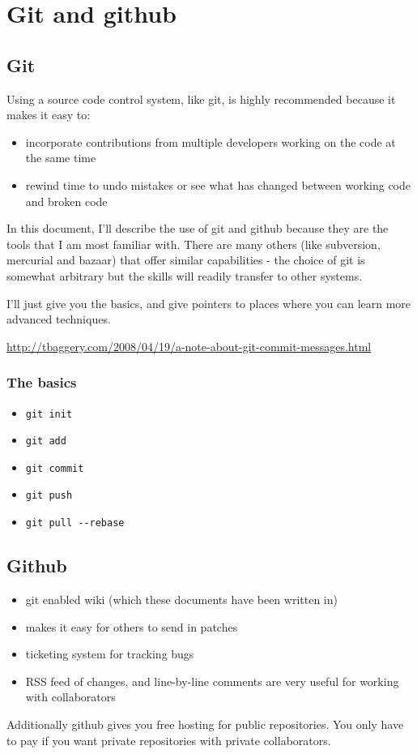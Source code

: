 \chapter{Git and github}

\section{Git}

Using a source code control system, like git, is highly recommended
because it makes it easy to:

\begin{itemize}
\item
  incorporate contributions from multiple developers working on the code
  at the same time
\item
  rewind time to undo mistakes or see what has changed between working
  code and broken code
\end{itemize}

In this document, I'll describe the use of git and github because they
are the tools that I am most familiar with. There are many others (like
subversion, mercurial and bazaar) that offer similar capabilities - the
choice of git is somewhat arbitrary but the skills will readily transfer
to other systems.

I'll just give you the basics, and give pointers to places where you can
learn more advanced techniques.

\url{http://tbaggery.com/2008/04/19/a-note-about-git-commit-messages.html}

\subsection{The basics}

\begin{itemize}
\itemsep1pt\parskip0pt
\item
  \texttt{git init}
\item
  \texttt{git add}
\item
  \texttt{git commit}
\item
  \texttt{git push}
\item
  \texttt{git pull -\/-rebase}
\end{itemize}

\section{Github}

\begin{itemize}
\itemsep1pt\parskip0pt
\item
  git enabled wiki (which these documents have been written in)
\item
  makes it easy for others to send in patches
\item
  ticketing system for tracking bugs
\item
  RSS feed of changes, and line-by-line comments are very useful for
  working with collaborators
\end{itemize}

Additionally github gives you free hosting for public repositories. You
only have to pay if you want private repositories with private
collaborators.
